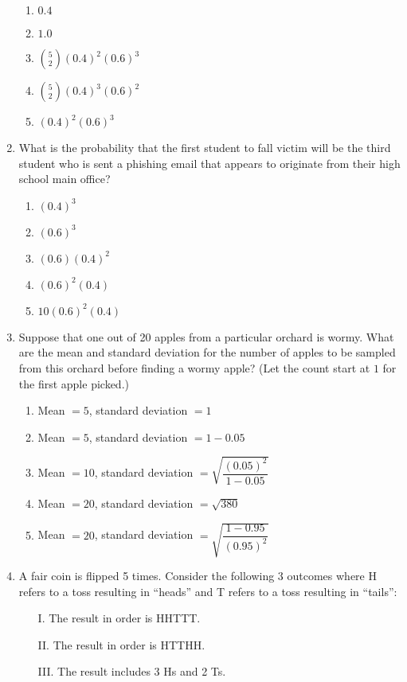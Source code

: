 \documentclass{article}
\begin{document}
\begin{enumerate}[label=\textbf{S\arabic*.}]
\begin{enumerate}
  \item $0.4$
  \item $1.0$
  \item $\binom{5}{2}(0.4)^2(0.6)^3$
  \item $\binom{5}{2}(0.4)^3(0.6)^2$
  \item $(0.4)^2(0.6)^3$
\end{enumerate}

\item What is the probability that the first student to fall victim will be the third student who is sent a phishing email that appears to originate from their high school main office? 

\begin{enumerate}
  \item $(0.4)^3$
  \item $(0.6)^3$
  \item $(0.6)(0.4)^2$
  \item $(0.6)^2(0.4)$
  \item $10(0.6)^2(0.4)$
\end{enumerate}

\item Suppose that one out of 20 apples from a particular orchard is wormy. What are the mean and standard deviation for the number of apples to be sampled from this orchard before finding a wormy apple? (Let the count start at $1$ for the first apple picked.) 

\begin{enumerate}
  \item Mean $=5$, standard deviation $=1$
  \item Mean $=5$, standard deviation $=1-0.05$
  \item Mean $=10$, standard deviation $=\sqrt{\dfrac{(0.05)^2}{1-0.05}}$
  \item Mean $=20$, standard deviation $=\sqrt{380}$
  \item Mean $=20$, standard deviation $=\sqrt{\dfrac{1-0.95}{(0.95)^2}}$
\end{enumerate}

\item A fair coin is flipped 5 times. Consider the following 3 outcomes where H refers to a toss resulting in “heads” and T refers to a toss resulting in “tails”:

\begin{itemize}
  \item[I.] The result in order is HHTTT.
  \item[II.] The result in order is HTTHH.
  \item[III.] The result includes 3 Hs and 2 Ts.
\end{itemize}


\end{enumerate}
\end{document}

